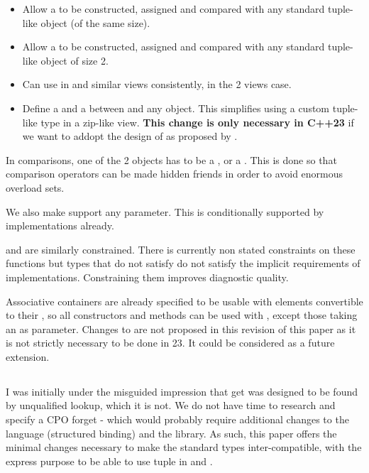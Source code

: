 \documentclass{wg21}
\begin{document}
\begin{itemize}
    \item Allow a  to be constructed, assigned and compared with any standard tuple-like object (of the same size).
    \item Allow a  to be constructed, assigned and compared with any standard tuple-like object of size 2.
    \item Can use  in  and similar views consistently, in the 2 views case.
    \item Define a  and a  between  and any  object. This simplifies using a custom tuple-like type in a zip-like view. \textbf{This change is only necessary in C++23}
    if we want to addopt the design of  as proposed by .
\end{itemize}

In comparisons, one of the 2 objects has to be a , or a . This is done so that comparison operators can be made hidden friends in order to avoid enormous overload sets.

We also make  support any  parameter.
This is conditionally supported by implementations already.

 and  are similarly constrained. There is currently non stated constraints on these functions but
types that do not satisfy  do not satisfy the implicit requirements of implementations.
Constraining them improves diagnostic quality.

Associative containers are already specified to be usable with elements convertible to their
, so all constructors and methods can be used with , except those taking an
 as parameter. Changes to   are not proposed in this revision of this paper as it is not strictly necessary to be done in 23. It could be considered as a future extension.


\subsection{}

I was initially under the misguided impression that get was designed to be found by unqualified lookup, which it is not.
We do not have time to research and specify a CPO forget - which would probably require additional changes to the language (structured binding) and the library.
As such, this paper offers the minimal changes necessary to make the standard types inter-compatible, with the express purpose to
be able to use tuple in  and .
\end{document}

